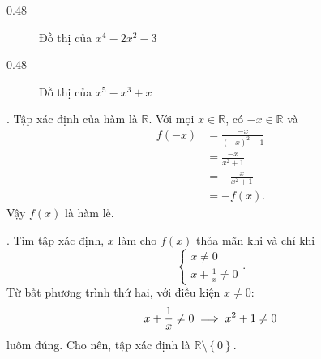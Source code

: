 {
   \begin{minipageindent}{0.48\textwidth}
      \begin{figure}[H]
         \centering
         \caption{Đồ thị của $x^{4} - 2 x^{2} - 3$}
      \end{figure}
   \end{minipageindent}
   \hfill
   \begin{minipageindent}{0.48\textwidth}
      \begin{figure}[H]
         \centering
         \caption{Đồ thị của $x^{5} - x^{3} + x$}
      \end{figure}
   \end{minipageindent}
}

. Tập xác định của hàm là $\mathbb{R}$. Với mọi $x \in \mathbb{R}$, có $-x \in \mathbb{R}$ và
\begin{align*}
   f(-x) &= \frac{-x}{(-x)^2 + 1}\\
   &= \frac{-x}{x^2 + 1}\\
   &= -\frac{x}{x^2 + 1}\\
   &= -f(x).
\end{align*}
Vậy $f(x)$ là hàm lẻ.

. Tìm tập xác định, $x$ làm cho $f(x)$ thỏa mãn khi và chỉ khi
\begin{equation*}
   \begin{cases}
      x \neq 0 \\
      x + \frac{1}{x} \neq 0
   \end{cases}.
\end{equation*}
Từ bất phương trình thứ hai, với điều kiện $x \neq 0$:
\begin{equation*}
   x + \frac{1}{x} \neq 0 \\
   \implies x^2 + 1 \neq 0
\end{equation*}
luôm đúng. Cho nên, tập xác định là $\mathbb{R} \setminus \left\{0\right\}$.

